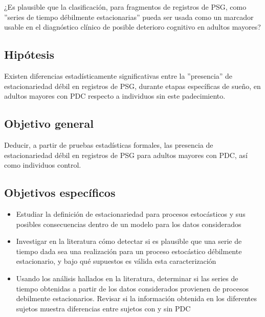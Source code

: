 \documentclass[12pt,a4paper]{mitthesis}
\begin{document}
¿Es plausible que la clasificaci\'on, para fragmentos de registros de PSG, como ''series de tiempo 
d\'ebilmente estacionarias'' pueda ser usada como un marcador usable en el diagn\'ostico cl\'inico
de posible deterioro cognitivo en adultos mayores?


\subsection{Hip\'otesis}

Existen diferencias estad\'isticamente significativas entre la ''presencia'' de estacionariedad 
d\'ebil en registros de PSG, durante etapas espec\'ificas de sue\~no, en adultos mayores con PDC 
respecto a individuos sin este padecimiento.


\subsection{Objetivo general}

Deducir, a partir de pruebas estad\'isticas formales, las presencia de estacionariedad d\'ebil en
registros de PSG para adultos mayores con PDC, as\'i como individuos control.


\subsection{Objetivos espec\'ificos}

\begin{itemize}
\item Estudiar la definici\'on de estacionariedad para procesos estoc\'asticos y sus posibles 
consecuencias dentro de un modelo para los datos considerados

\item Investigar en la literatura c\'omo detectar si es plausible que una serie de tiempo dada sea 
una realizaci\'on para un proceso estoc\'astico d\'ebilmente estacionario, y bajo qu\'e supuestos 
es v\'alida esta caracterizaci\'on

\item Usando los an\'alisis hallados en la literatura, determinar si las series de tiempo 
obtenidas a partir de los datos considerados provienen de procesos debilmente estacionarios.
Revisar si la informaci\'on obtenida en los diferentes sujetos muestra diferencias entre sujetos 
con y sin PDC
\end{itemize}
\end{document}
